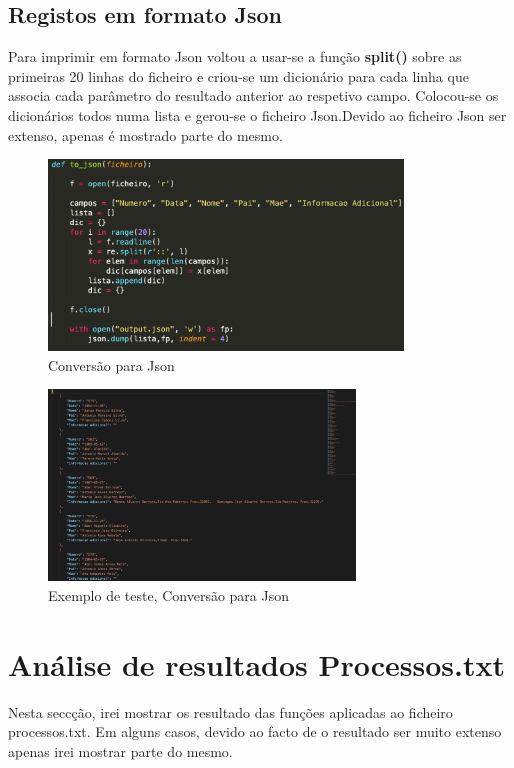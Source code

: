 \documentclass[a4paper, 12pt]{article}
\begin{document}
\subsection{Registos em formato Json}
Para imprimir em formato Json voltou a usar-se a função \textbf{split()} sobre as primeiras 20 linhas do ficheiro e criou-se um dicionário para cada linha que associa cada parâmetro do resultado anterior ao respetivo campo. Colocou-se os dicionários todos numa lista e gerou-se o ficheiro Json.Devido ao ficheiro Json ser extenso, apenas é mostrado parte do mesmo.
\begin{figure}[H]
    \centering
    \includegraphics[height=2in]{Captura de ecrã 2022-10-29, às 00.56.50.png}
    \caption{Conversão para Json}
    \label{fig:my_label}
\end{figure}
\begin{figure}[H]
    \centering
    \includegraphics[height=2in]{to_json-teste.png}
    \caption{Exemplo de teste, Conversão para Json}
    \label{fig:my_label}
\end{figure}
\newpage
\section{Análise de resultados Processos.txt}
Nesta seccção, irei mostrar os resultado das funções aplicadas ao ficheiro processos.txt. Em alguns casos, devido ao facto de o resultado ser muito extenso apenas irei mostrar parte do mesmo.
\end{document}
